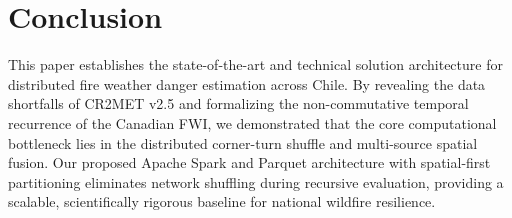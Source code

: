 \documentclass[10pt,conference]{IEEEtran}
\begin{document}
\section{Conclusion}
This paper establishes the state-of-the-art and technical solution architecture for distributed fire weather danger estimation across Chile. By revealing the data shortfalls of CR2MET v2.5 and formalizing the non-commutative temporal recurrence of the Canadian FWI, we demonstrated that the core computational bottleneck lies in the distributed corner-turn shuffle and multi-source spatial fusion. Our proposed Apache Spark and Parquet architecture with spatial-first partitioning eliminates network shuffling during recursive evaluation, providing a scalable, scientifically rigorous baseline for national wildfire resilience.

\balance

\end{document}
